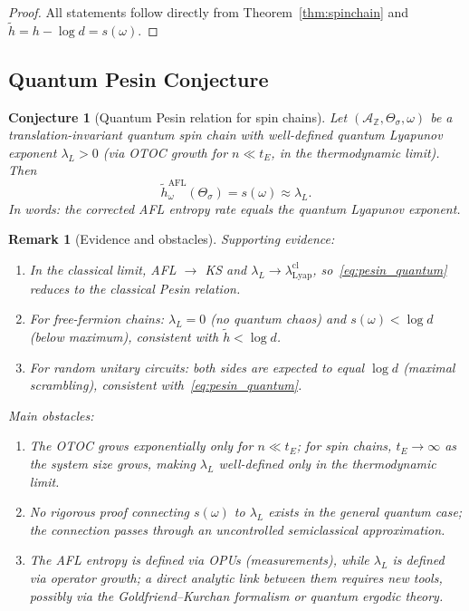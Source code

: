 \documentclass[12pt,a4paper]{article}
\newtheorem{remark}[theorem]{Remark}
\newtheorem{conjecture}[theorem]{Conjecture}
\newcommand{\A}{\mathcal{A}}
\begin{document}
\begin{proof}
All statements follow directly from Theorem~\ref{thm:spinchain} and $\tilde{h}=h-\log d=s(\omega)$.
\end{proof}

\subsection{Quantum Pesin Conjecture}

\begin{conjecture}[Quantum Pesin relation for spin chains]
\label{conj:pesin}
Let $(\A_\mathbb{Z},\Theta_\sigma,\omega)$ be a translation-invariant quantum spin chain
with well-defined quantum Lyapunov exponent $\lambda_L>0$ (via OTOC growth for
$n\ll t_E$, in the thermodynamic limit).  Then
\begin{equation}\label{eq:pesin_quantum}
  \tilde{h}_\omega^{\mathrm{AFL}}(\Theta_\sigma) = s(\omega) \approx \lambda_L.
\end{equation}
In words: the corrected AFL entropy rate equals the quantum Lyapunov exponent.
\end{conjecture}

\begin{remark}[Evidence and obstacles]
\emph{Supporting evidence:}
\begin{enumerate}
  \item In the classical limit, AFL $\to$ KS and $\lambda_L\to\lambda_{\mathrm{Lyap}}^{\mathrm{cl}}$,
        so~\eqref{eq:pesin_quantum} reduces to the classical Pesin relation.
  \item For free-fermion chains: $\lambda_L=0$ (no quantum chaos) and $s(\omega)<\log d$
        (below maximum), consistent with $\tilde{h}<\log d$.
  \item For random unitary circuits: both sides are expected to equal $\log d$ (maximal
        scrambling), consistent with~\eqref{eq:pesin_quantum}.
\end{enumerate}
\emph{Main obstacles:}
\begin{enumerate}
  \item The OTOC grows exponentially only for $n\ll t_E$; for spin chains, $t_E\to\infty$
        as the system size grows, making $\lambda_L$ well-defined only in the thermodynamic
        limit.
  \item No rigorous proof connecting $s(\omega)$ to $\lambda_L$ exists in the general
        quantum case; the connection passes through an uncontrolled semiclassical
        approximation.
  \item The AFL entropy is defined via OPUs (measurements), while $\lambda_L$ is defined
        via operator growth; a direct analytic link between them requires new tools,
        possibly via the Goldfriend--Kurchan formalism or quantum ergodic theory.
\end{enumerate}
\end{remark}
\end{document}
